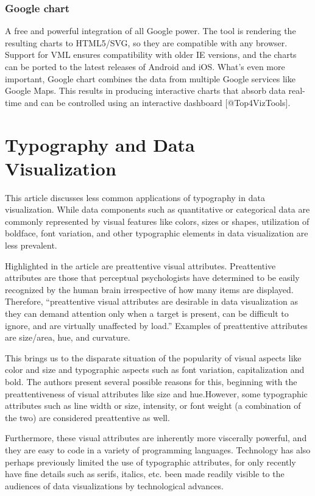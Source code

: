 \documentclass[]{book}
\theoremstyle{definition}
\theoremstyle{definition}
\theoremstyle{definition}
\theoremstyle{remark}
\begin{document}
\subsubsection{Google chart}\label{google-chart}

A free and powerful integration of all Google power. The tool is
rendering the resulting charts to HTML5/SVG, so they are compatible with
any browser. Support for VML ensures compatibility with older IE
versions, and the charts can be ported to the latest releases of Android
and iOS. What's even more important, Google chart combines the data from
multiple Google services like Google Maps. This results in producing
interactive charts that absorb data real-time and can be controlled
using an interactive dashboard {[}@Top4VizTools{]}.

\section{Typography and Data
Visualization}\label{typography-and-data-visualization}

This article discusses less common applications of typography in data
visualization. While data components such as quantitative or categorical
data are commonly represented by visual features like colors, sizes or
shapes, utilization of boldface, font variation, and other typographic
elements in data visualization are less prevalent.

Highlighted in the article are preattentive visual attributes.
Preattentive attributes are those that perceptual psychologists have
determined to be easily recognized by the human brain irrespective of
how many items are displayed. Therefore, ``preattentive visual
attributes are desirable in data visualization as they can demand
attention only when a target is present, can be difficult to ignore, and
are virtually unaffected by load.'' Examples of preattentive attributes
are size/area, hue, and curvature.

This brings us to the disparate situation of the popularity of visual
aspects like color and size and typographic aspects such as font
variation, capitalization and bold. The authors present several possible
reasons for this, beginning with the preattentiveness of visual
attributes like size and hue.However, some typographic attributes such
as line width or size, intensity, or font weight (a combination of the
two) are considered preattentive as well.

Furthermore, these visual attributes are inherently more viscerally
powerful, and they are easy to code in a variety of programming
languages. Technology has also perhaps previously limited the use of
typographic attributes, for only recently have fine details such as
serifs, italics, etc. been made readily visible to the audiences of data
visualizations by technological advances.
\end{document}
